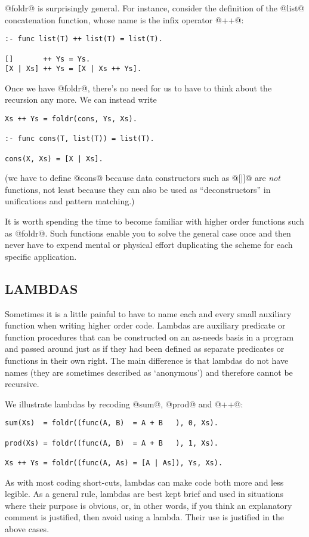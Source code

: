 \documentclass[a4paper,11pt,notitlepage,onecolumn]{article}
\begin{document}
@foldr@ is surprisingly general.  For instance, consider the definition
of the @list@ concatenation function, whose name is the infix operator
@++@:
\begin{verbatim}
:- func list(T) ++ list(T) = list(T).

[]       ++ Ys = Ys.
[X | Xs] ++ Ys = [X | Xs ++ Ys].
\end{verbatim}
Once we have @foldr@, there's no need for us to have to think about the
recursion any more.  We can instead write
\begin{verbatim}
Xs ++ Ys = foldr(cons, Ys, Xs).

:- func cons(T, list(T)) = list(T).

cons(X, Xs) = [X | Xs].
\end{verbatim}
(we have to define @cons@ because data constructors such as @[|]@ are
\emph{not} functions, not least because they can also be used as
``deconstructors'' in unifications and pattern matching.)

It is worth spending the time to become familiar with higher order
functions such as @foldr@.  Such functions enable you to solve the
general case once and then never have to expend mental or physical
effort duplicating the scheme for each specific application.

\subsection{LAMBDAS}

Sometimes it is a little painful to have to name each and every small
auxiliary function when writing higher order code.  Lambdas are
auxiliary predicate or function procedures that can be constructed on an
as-needs basis in a program and passed around just as if they had been
defined as separate predicates or functions in their own right.  The
main difference is that lambdas do not have names (they are sometimes
described as `anonymous') and therefore cannot be recursive.

We illustrate lambdas by recoding @sum@, @prod@ and @++@:
\begin{verbatim}
sum(Xs)  = foldr((func(A, B)  = A + B   ), 0, Xs).

prod(Xs) = foldr((func(A, B)  = A + B   ), 1, Xs).

Xs ++ Ys = foldr((func(A, As) = [A | As]), Ys, Xs).
\end{verbatim}
As with most coding short-cuts, lambdas can make code both more and less
legible.  As a general rule, lambdas are best kept brief and used in
situations where their purpose is obvious, or, in other words, if you
think an explanatory comment is justified, then avoid using a lambda.
Their use is justified in the above cases.
\end{document}
